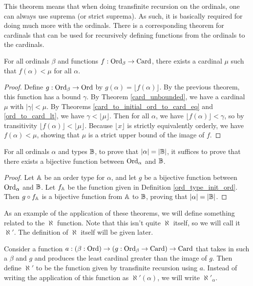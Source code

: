 \documentclass[../../math.tex]{subfiles}
\begin{document}
This theorem means that when doing transfinite recursion on the ordinals, one
can always use suprema (or strict suprema).  As such, it is basically required
for doing much more with the ordinals.  There is a corresponding theorem for
cardinals that can be used for recursively defining functions from the ordinals
to the cardinals.

\begin{theorem} \label{ord_card_large}
    For all ordinals $\beta$ and functions $f : \operatorname{Ord}_\beta \to \operatorname{Card}$, there
    exists a cardinal $\mu$ such that $f(\alpha) < \mu$ for all $\alpha$.
\end{theorem}
\begin{proof}
    Define $g : \operatorname{Ord}_\beta \to \operatorname{Ord}$ by $g(\alpha) = \lfloor f(\alpha) \rfloor$.
    By the previous theorem, this function has a bound $\gamma$.  By Theorem
    \ref{card_unbounded}, we have a cardinal $\mu$ with $|\gamma| < \mu$.  By
    Theorems \ref{card_to_initial_ord_to_card_eq} and \ref{ord_to_card_lt}, we
    have $\gamma < \lfloor \mu \rfloor$.  Then for all $\alpha$, we have
    $\lfloor f(\alpha) \rfloor < \gamma$, so by transitivity $\lfloor f(\alpha)
    \rfloor < \lfloor \mu \rfloor$.  Because $\lfloor x \rfloor$ is strictly
    equivalently orderly, we have $f(\alpha) < \mu$, showing that $\mu$ is a
    strict upper bound of the image of $f$.
\end{proof}

\begin{theorem} \label{ord_to_card_eq} \label{ord_to_card_eq1}
    \label{ord_to_card_eq2}
    For all ordinals $\alpha$ and types $\mathbb{B}$, to prove that $|\alpha| = |\mathbb{B}|$,
    it suffices to prove that there exists a bijective function between
    $\operatorname{Ord}_\alpha$ and $\mathbb{B}$.
\end{theorem}
\begin{proof}
    Let $\mathbb{A}$ be an order type for $\alpha$, and let $g$ be a bijective function
    between $\operatorname{Ord}_\alpha$ and $\mathbb{B}$.  Let $f_{\mathbb{A}}$ be the function given in
    Definition \ref{ord_type_init_ord}.  Then $g \circ f_{\mathbb{A}}$ is a bijective
    function from $\mathbb{A}$ to $\mathbb{B}$, proving that $|\alpha| = |\mathbb{B}|$.
\end{proof}

As an example of the application of these theorems, we will define something
related to the $\aleph$ function.  Note that this isn't quite $\aleph$ itself,
so we will call it $\aleph'$.  The definition of $\aleph$ itself will be given
later.

\begin{definition}
    Consider a function $a : (\beta : \operatorname{Ord}) \to (g : \operatorname{Ord}_\beta \to \operatorname{Card}) \to
    \operatorname{Card}$ that takes in such a $\beta$ and $g$ and produces the least cardinal
    greater than the image of $g$.  Then define $\aleph'$ to be the function
    given by transfinite recursion using $a$.  Instead of writing the
    application of this function as $\aleph'(\alpha)$, we will write
    $\aleph'_\alpha$.
\end{definition}
\end{document}
